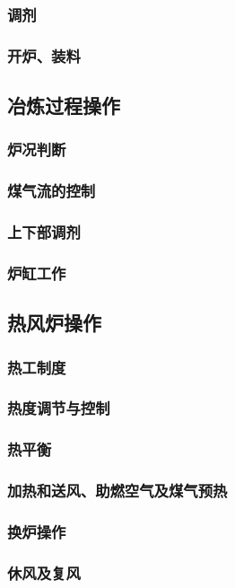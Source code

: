 \documentclass[UTF8]{../../ApplicationUniverse}
\begin{document}
        \subsubsection{调剂}
        \subsubsection{开炉、装料}
    \subsection{冶炼过程操作}
        \subsubsection{炉况判断}
        \subsubsection{煤气流的控制}
        \subsubsection{上下部调剂}
        \subsubsection{炉缸工作}
    \subsection{热风炉操作}
        \subsubsection{热工制度}
        \subsubsection{热度调节与控制}
        \subsubsection{热平衡}
        \subsubsection{加热和送风、助燃空气及煤气预热}
        \subsubsection{换炉操作}
        \subsubsection{休风及复风}
\end{document}
